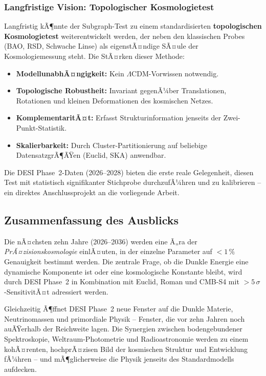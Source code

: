 ﻿\documentclass[a4paper,12pt]{article}
\theoremstyle{definition}
\theoremstyle{remark}
\begin{document}
\subsubsection*{Langfristige Vision: Topologischer Kosmologietest}

Langfristig kÃ¶nnte der Subgraph-Test zu einem standardisierten
\textbf{topologischen Kosmologietest} weiterentwickelt werden, der
neben den klassischen Probes (BAO, RSD, Schwache Linse) als eigenstÃ¤ndige
SÃ¤ule der Kosmologiemessung steht. Die StÃ¤rken dieser Methode:

\begin{itemize}
  \item \textbf{ModellunabhÃ¤ngigkeit:} Kein $\Lambda$CDM-Vorwissen notwendig.
  \item \textbf{Topologische Robustheit:} Invariant gegenÃ¼ber Translationen,
    Rotationen und kleinen Deformationen des kosmischen Netzes.
  \item \textbf{KomplementaritÃ¤t:} Erfasst Strukturinformation jenseits
    der Zwei-Punkt-Statistik.
  \item \textbf{Skalierbarkeit:} Durch Cluster-Partitionierung auf beliebige
    DatensatzgrÃ¶ÃŸen (Euclid, SKA) anwendbar.
\end{itemize}

Die DESI Phase~2-Daten (2026--2028) bieten die erste reale Gelegenheit,
diesen Test mit statistisch signifikanter Stichprobe durchzufÃ¼hren
und zu kalibrieren -- ein direktes Anschlussprojekt an die vorliegende Arbeit.

\subsection{Zusammenfassung des Ausblicks}

Die nÃ¤chsten zehn Jahre (2026--2036) werden eine Ã„ra der \textit{PrÃ¤zisionskosmologie}
einlÃ¤uten, in der einzelne Parameter auf $< 1\,\%$ Genauigkeit bestimmt werden.
Die zentrale Frage, ob die Dunkle Energie eine dynamische Komponente ist oder
eine kosmologische Konstante bleibt, wird durch DESI Phase~2 in Kombination
mit Euclid, Roman und CMB-S4 mit $> 5\,\sigma$-SensitivitÃ¤t adressiert werden.

Gleichzeitig Ã¶ffnet DESI Phase~2 neue Fenster auf die Dunkle Materie,
Neutrinomassen und primordiale Physik -- Fenster, die vor zehn Jahren noch
auÃŸerhalb der Reichweite lagen. Die Synergien zwischen bodengebundener
Spektroskopie, Weltraum-Photometrie und Radioastronomie werden zu einem
kohÃ¤renten, hochprÃ¤zisen Bild der kosmischen Struktur und Entwicklung
fÃ¼hren -- und mÃ¶glicherweise die Physik jenseits des Standardmodells aufdecken.
\end{document}
